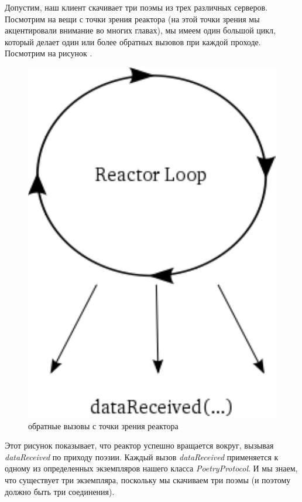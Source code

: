 Допустим, наш клиент скачивает три поэмы из трех 
различных серверов. Посмотрим на вещи с точки зрения 
реактора (на этой точки зрения мы акцентировали внимание 
во многих главах), мы имеем один большой цикл, который 
делает один или более обратных вызовов при каждой проходе. 
Посмотрим на рисунок \label{fig:reactor-2}. 

\begin{figure}[h]
\begin{center}
    \includegraphics[height=0.3\textheight]{images/reactor-2.pdf}
    \caption{обратные вызовы с точки зрения реактора\label{fig:reactor-2}}
\end{center}
\end{figure}


Этот рисунок показывает, что реактор успешно вращается 
вокруг, вызывая \textit{dataReceived} по приходу  поэзии. 
Каждый вызов \textit{dataReceived} применяется к одному из 
определенных экземпляров нашего класса \textit{PoetryProtocol}. 
И мы знаем, что существует три экземпляра, поскольку 
мы скачиваем три поэмы (и поэтому должно быть три соединения). 


